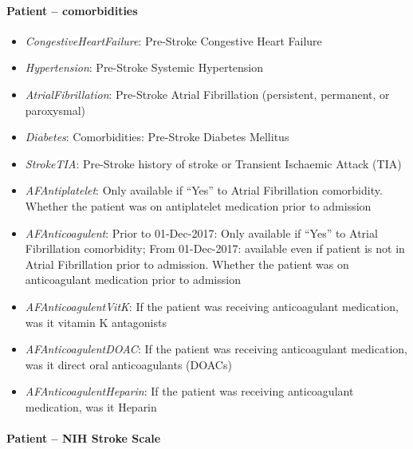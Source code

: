 \paragraph{Patient -- comorbidities}

\begin{itemize}
\item \emph{CongestiveHeartFailure}: Pre-Stroke Congestive Heart Failure
\item \emph{Hypertension}: Pre-Stroke Systemic Hypertension
\item \emph{AtrialFibrillation}: Pre-Stroke Atrial Fibrillation (persistent,
  permanent, or paroxysmal)
\item \emph{Diabetes}: Comorbidities: Pre-Stroke Diabetes Mellitus
\item \emph{StrokeTIA}: Pre-Stroke history of stroke or Transient Ischaemic Attack
  (TIA)
\item \emph{AFAntiplatelet}: Only available if ``Yes'' to Atrial Fibrillation
  comorbidity. Whether the patient was on antiplatelet medication prior
  to admission
\item \emph{AFAnticoagulent}: Prior to 01-Dec-2017: Only available if ``Yes'' to
  Atrial Fibrillation comorbidity; From 01-Dec-2017: available even if
  patient is not in Atrial Fibrillation prior to admission. Whether the
  patient was on anticoagulant medication prior to admission
\item \emph{AFAnticoagulentVitK}: If the patient was receiving anticoagulant
  medication, was it vitamin K antagonists
\item \emph{AFAnticoagulentDOAC}: If the patient was receiving anticoagulant
  medication, was it direct oral anticoagulants (DOACs)
\item \emph{AFAnticoagulentHeparin}: If the patient was receiving anticoagulant
  medication, was it Heparin
\end{itemize}

\paragraph{Patient -- NIH Stroke Scale}

